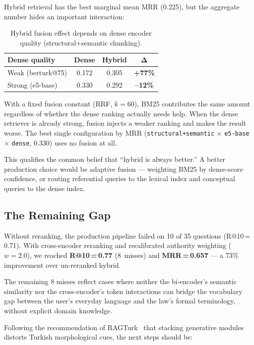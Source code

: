 \documentclass[11pt,a4paper,twocolumn]{article}
\begin{document}
Hybrid retrieval has the best marginal mean MRR (0.225), but the aggregate number hides an important interaction:

\begin{table}[t]
\centering
\caption{Hybrid fusion effect depends on dense encoder quality (structural+semantic chunking).}
\label{tab:fusion}
\small
\begin{tabular}{@{}lccc@{}}
\toprule
\textbf{Dense quality} & \textbf{Dense} & \textbf{Hybrid} & $\boldsymbol{\Delta}$ \\
\midrule
Weak (berturk@75) & 0.172 & 0.305 & \textbf{+77\%} \\
Strong (e5-base)  & 0.330 & 0.292 & \textbf{--12\%} \\
\bottomrule
\end{tabular}
\end{table}

With a fixed fusion constant (RRF, $k{=}60$), BM25 contributes the same amount regardless of whether the dense ranking actually needs help. When the dense retriever is already strong, fusion injects a weaker ranking and makes the result worse. The best single configuration by MRR (\texttt{structural+semantic} $\times$ \texttt{e5-base} $\times$ \texttt{dense}, 0.330) uses no fusion at all.

This qualifies the common belief that ``hybrid is always better.'' A better production choice would be adaptive fusion --- weighting BM25 by dense-score confidence, or routing referential queries to the lexical index and conceptual queries to the dense index.

\subsection{The Remaining Gap}

Without reranking, the production pipeline failed on 10 of 35 questions (R@10\,=\,0.71). With cross-encoder reranking and recalibrated authority weighting ($w{=}2.0$), we reached \textbf{R@10\,=\,0.77} (8~misses) and \textbf{MRR\,=\,0.657} --- a 73\% improvement over un-reranked hybrid.

The remaining 8 misses reflect cases where neither the bi-encoder's semantic similarity nor the cross-encoder's token interactions can bridge the vocabulary gap between the user's everyday language and the law's formal terminology, without explicit domain knowledge.

Following the recommendation of RAGTurk~\cite{ragturk2026} that stacking generative modules distorts Turkish morphological cues, the next steps should be:
\end{document}
